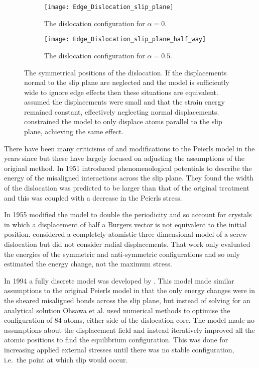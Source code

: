 \begin{figure}
\centering
\begin{subfigure}{0.5\textwidth}
\centering\texttt{[image: Edge\_Dislocation\_slip\_plane]}
\caption{The dislocation configuration for $\alpha=0$.}
\end{subfigure}


\begin{subfigure}{0.5\textwidth}
\centering\texttt{[image: Edge\_Dislocation\_slip\_plane\_half\_way]}
\caption{The dislocation configuration for $\alpha=0.5$.}
\end{subfigure}

\caption[The symmetrical positions of the dislocation.]{The symmetrical positions of the dislocation. If the displacements normal to the slip plane are neglected and the model is sufficiently wide to ignore edge effects then these situations are equivalent. \citet{Peierls1940} assumed the displacements were small and that the strain energy remained constant, effectively neglecting normal displacements. \citet{Clegg2006} constrained the model to only displace atoms parallel to the slip plane, achieving the same effect.\label{fig:symmetrical_positions}}
\end{figure}


There have been many criticisms of and modifications to the Peierls model in the years since but these have largely focused on adjusting the assumptions of the original method.
In 1951 \citet{Foreman1951} introduced phenomenological potentials to describe the energy of the misaligned interactions across the slip plane. They found the width of the dislocation was predicted to be larger than that of the original treatment and this was coupled with a decrease in the Peierls stress.

In 1955 \citet{Huntington1955} modified the model to double the periodicity and so account for crystals in which a displacement of half a Burgers vector is not equivalent to the initial position.
\citet{Maradudin1959} considered a completely atomistic three dimensional model of a screw dislocation but did not consider radial displacements. That work only evaluated the energies of the symmetric and anti-symmetric configurations and so only estimated the energy change, not the maximum stress.



In 1994 a fully discrete model was developed by \citet{Ohsawa1994}. This model made similar assumptions to the original Peierls model in that the only energy changes were in the sheared misaligned bonds across the slip plane, but instead of solving for an analytical solution Ohsawa et al. used numerical methods to optimise the configuration of 84 atoms,  either side of the dislocation core. The model made no assumptions about the displacement field and instead iteratively improved all the atomic positions to find the equilibrium configuration. This was done for increasing applied external stresses until there was no stable configuration, i.e.\ the point at which slip would occur.

